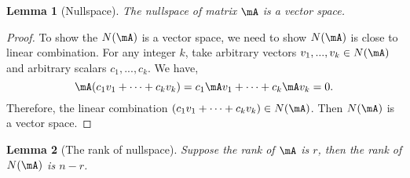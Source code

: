 \documentclass[11pt]{article}
\theoremstyle{plain}
\newtheorem{lem}{Lemma}
\theoremstyle{definition}
\begin{document}
\vspace{.2cm}

\begin{lem}[Nullspace] 
The \textit{nullspace} of matrix $\mA$ is a vector space. 
\end{lem}

\begin{proof}
To show the $N(\mA)$ is a vector space, we need to show $N(\mA)$ is close to linear combination. For any integer $k$, take arbitrary vectors $v_1 ,...,v_k \in N(\mA)$ and arbitrary scalars $c_1, ..., c_k$. We have,
\[ \mA(c_1 v_1 + \cdots + c_k v_k) = c_1 \mA v_1 + \cdots + c_k \mA v_k = 0. \]
Therefore, the linear combination $(c_1 v_1 + \cdots + c_k v_k) \in N(\mA)$. Then $N(\mA)$ is a vector space.
\end{proof}

\begin{lem}[The rank of nullspace]\label{lem:ranknull}
Suppose the rank of $\mA$ is $r$, then the rank of $N(\mA)$ is $n - r$.
\end{lem}
\end{document}
